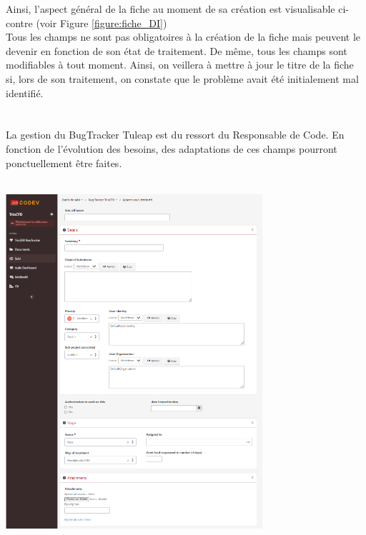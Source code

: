 \begin{minipage}[c]{0.35\linewidth}

\vspace*{0.2cm}
Ainsi, l'aspect général de la fiche au moment de sa création est visualisable ci-contre (voir Figure \ref{figure:fiche_DI})
\\
Tous les champs ne sont pas obligatoires à la création de la fiche mais peuvent le devenir en fonction de son état de traitement. De même, tous les champs sont modifiables à tout moment. Ainsi, on veillera à mettre à jour le titre de la fiche si, lors de son traitement, on constate que le problème avait été initialement mal identifié.\\
\\
\\
La gestion du BugTracker Tuleap est du ressort du Responsable de Code. En fonction de l'évolution des besoins, des adaptations de ces champs pourront ponctuellement être faites.
\\
\\
\end{minipage} \hfill
\begin{minipage}[c]{0.6\linewidth}
   
   \includegraphics[width=9.5cm]{pictures/Fiche_DI.png}\vspace*{0.2cm}
\end{minipage}

